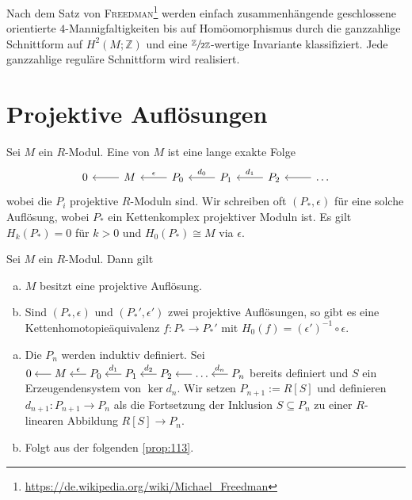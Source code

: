 \begin{ausblick}[{name=[{Klassifizierung von geschlossenen 4-Mannigfaltigkeiten}]}]
	Nach dem Satz von \textsc{Freedman}\footnote{\url{https://de.wikipedia.org/wiki/Michael_Freedman}} werden einfach zusammenhängende geschlossene orientierte $4$-Mannigfaltigkeiten bis auf Homöomorphismus durch die ganzzahlige Schnittform auf $H^2(M;\mathbb{Z})$ und eine $\sfrac{\mathbb{Z}}{2 \mathbb{Z}}$-wertige Invariante klassifiziert.
	Jede ganzzahlige reguläre Schnittform wird realisiert.
\end{ausblick}
\newpage

\section{Projektive Auflösungen} %
\label{sec:11}

\begin{definition}[{name=[projektive Auflösung]}]
	Sei $M$ ein $R$-Modul.
	Eine  von $M$ ist eine lange exakte Folge 
	\[
		\begin{tikzcd}
			0 & M \lar & P_0 \lar["\epsilon"'] & P_1 \lar["d_0"'] & P_2 \lar["d_1"'] & \ldots \lar
		\end{tikzcd}
	\]
	wobei die $P_i$ projektive $R$-Moduln sind.
	Wir schreiben oft $(P_*,\epsilon)$ für eine solche Auflösung, wobei $P_*$ ein Kettenkomplex projektiver Moduln ist. 
	Es gilt $H_k(P_*)=0$ für $k>0$ und $H_0(P_*)\cong M$ via $\epsilon$.
\end{definition}

\begin{satz}[{name={Fundamentalsatz der homologischen Algebra}},label=satz:ex_eind_proj_aufl]
	Sei $M$ ein $R$-Modul. Dann gilt
	\begin{enumerate}[a),itemsep=0pt]
		\item $M$ besitzt eine projektive Auflösung.
		\item Sind $(P_*,\epsilon)$ und $(P_*',\epsilon')$ zwei projektive Auflösungen, so gibt es eine Kettenhomotopieäquivalenz $f \colon P_* \to P_*'$ mit $H_0(f)= (\epsilon') ^{-1} \circ \epsilon$.
	\end{enumerate}
\end{satz}
\begin{beweis}
	\begin{enumerate}[a),itemsep=0pt]
		\item Die $P_n$ werden induktiv definiert. 
		Sei 
		$\begin{tikzcd}[cramped,sep=1.5em]
			0 & M \lar & P_0 \lar["\epsilon"'] & P_1 \lar["d_1"'] & P_2 \lar["d_2"'] & \ldots \lar & P_n \lar["d_n"']
		\end{tikzcd}$
		bereits definiert und $S$ ein Erzeugendensystem von $\ker d_n$.
		Wir setzen $P_{n+1} := R[S]$ und definieren $d_{n+1} \colon P_{n+1} \to P_n$ als die Fortsetzung der Inklusion $S \subseteq P_n$ zu einer $R$-linearen Abbildung $R[S]\to P_n$.
		\item Folgt aus der folgenden \autoref{prop:113}.\qedhere
	\end{enumerate}
\end{beweis}

